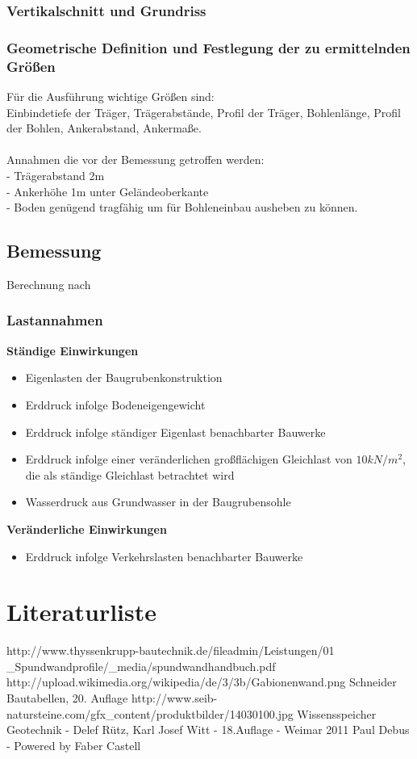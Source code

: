 \documentclass[11pt,fleqn,a4paper,halfparskip]{article}
\begin{document}
\subsubsection{Vertikalschnitt und Grundriss}
\subsubsection{Geometrische Definition und Festlegung der zu ermittelnden Größen}
Für die Ausführung wichtige Größen sind:\\
 Einbindetiefe der Träger, Trägerabstände, Profil der Träger, Bohlenlänge, Profil der Bohlen, Ankerabstand, Ankermaße. \\
\\
Annahmen die vor der Bemessung getroffen werden: \\
- Trägerabstand 2m\\
- Ankerhöhe 1m unter Geländeoberkante\\
- Boden genügend tragfähig um für Bohleneinbau ausheben zu können.
\newpage
\subsection{Bemessung}
Berechnung nach \cite[S.137ff]{wsp}
\subsubsection{Lastannahmen}
\textbf{Ständige Einwirkungen}
\begin{itemize}
\item Eigenlasten der Baugrubenkonstruktion
\item Erddruck infolge Bodeneigengewicht
\item Erddruck infolge ständiger Eigenlast benachbarter Bauwerke
\item Erddruck infolge einer veränderlichen großflächigen Gleichlast von $10kN/m^2$, die als ständige Gleichlast betrachtet wird
\item Wasserdruck aus Grundwasser in der Baugrubensohle
\end{itemize}
\textbf{Veränderliche Einwirkungen}
\begin{itemize}
\item Erddruck infolge Verkehrslasten benachbarter Bauwerke
\end{itemize}

\newpage
\listoffigures
\newpage
\section{Literaturliste}
\begin{thebibliography}{9}
http://www.thyssenkrupp-bautechnik.de/fileadmin/Leistungen/01 \_Spundwandprofile/\_media/spundwandhandbuch.pdf
 http://upload.wikimedia.org/wikipedia/de/3/3b/Gabionenwand.png
 Schneider Bautabellen, 20. Auflage
 http://www.seib-natursteine.com/gfx\_content/produktbilder/14030100.jpg
 Wissensspeicher Geotechnik - Delef Rütz, Karl Josef Witt - 18.Auflage - Weimar 2011
 Paul Debus - Powered by Faber Castell
\end{thebibliography}
\end{document}
